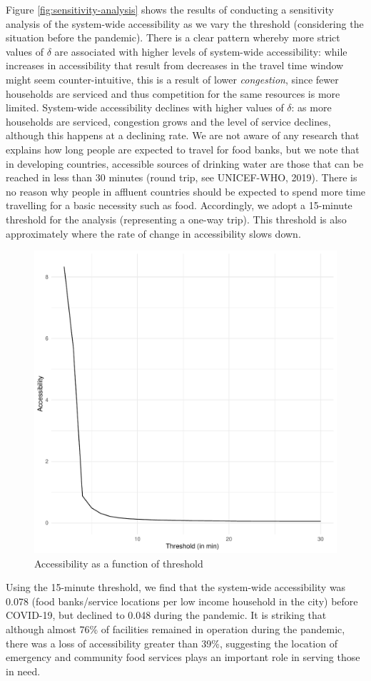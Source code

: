 \documentclass[]{elsarticle} %
\begin{document}
Figure \ref{fig:sensitivity-analysis} shows the results of conducting a
sensitivity analysis of the system-wide accessibility as we vary the
threshold (considering the situation before the pandemic). There is a
clear pattern whereby more strict values of \(\delta\) are associated
with higher levels of system-wide accessibility: while increases in
accessibility that result from decreases in the travel time window might
seem counter-intuitive, this is a result of lower \emph{congestion},
since fewer households are serviced and thus competition for the same
resources is more limited. System-wide accessibility declines with
higher values of \(\delta\): as more households are serviced, congestion
grows and the level of service declines, although this happens at a
declining rate. We are not aware of any research that explains how long
people are expected to travel for food banks, but we note that in
developing countries, accessible sources of drinking water are those
that can be reached in less than 30 minutes (round trip, see UNICEF-WHO,
2019). There is no reason why people in affluent countries should be
expected to spend more time travelling for a basic necessity such as
food. Accordingly, we adopt a 15-minute threshold for the analysis
(representing a one-way trip). This threshold is also approximately
where the rate of change in accessibility slows down.

\begin{figure}
\includegraphics[width=0.6\linewidth]{Accessibility-Foodbanks-Hamilton_files/figure-latex/plot-results-sensitivity-analysis-1} \caption{\label{fig:sensitivity-analysis}Accessibility as a function of threshold}\label{fig:plot-results-sensitivity-analysis}
\end{figure}

Using the 15-minute threshold, we find that the system-wide
accessibility was 0.078 (food banks/service locations per low income
household in the city) before COVID-19, but declined to 0.048 during the
pandemic. It is striking that although almost 76\% of facilities
remained in operation during the pandemic, there was a loss of
accessibility greater than 39\%, suggesting the location of emergency
and community food services plays an important role in serving those in
need.
\end{document}
